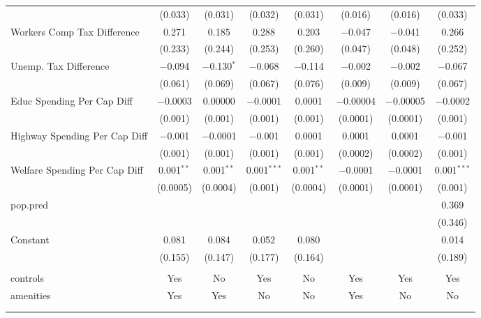 \begin{table}[!htbp]
\begin{tabular}{@{\extracolsep{5pt}}lccccccc}
  & (0.033) & (0.031) & (0.032) & (0.031) & (0.016) & (0.016) & (0.033) \\ 
  Workers Comp Tax Difference & 0.271 & 0.185 & 0.288 & 0.203 & $-$0.047 & $-$0.041 & 0.266 \\ 
  & (0.233) & (0.244) & (0.253) & (0.260) & (0.047) & (0.048) & (0.252) \\ 
  Unemp. Tax Difference & $-$0.094 & $-$0.130$^{*}$ & $-$0.068 & $-$0.114 & $-$0.002 & $-$0.002 & $-$0.067 \\ 
  & (0.061) & (0.069) & (0.067) & (0.076) & (0.009) & (0.009) & (0.067) \\ 
  Educ Spending Per Cap Diff & $-$0.0003 & 0.00000 & $-$0.0001 & 0.0001 & $-$0.00004 & $-$0.00005 & $-$0.0002 \\ 
  & (0.001) & (0.001) & (0.001) & (0.001) & (0.0001) & (0.0001) & (0.001) \\ 
  Highway Spending Per Cap Diff & $-$0.001 & $-$0.0001 & $-$0.001 & 0.0001 & 0.0001 & 0.0001 & $-$0.001 \\ 
  & (0.001) & (0.001) & (0.001) & (0.001) & (0.0002) & (0.0002) & (0.001) \\ 
  Welfare Spending Per Cap Diff & 0.001$^{**}$ & 0.001$^{**}$ & 0.001$^{***}$ & 0.001$^{**}$ & $-$0.0001 & $-$0.0001 & 0.001$^{***}$ \\ 
  & (0.0005) & (0.0004) & (0.001) & (0.0004) & (0.0001) & (0.0001) & (0.001) \\ 
  pop.pred &  &  &  &  &  &  & 0.369 \\ 
  &  &  &  &  &  &  & (0.346) \\ 
  Constant & 0.081 & 0.084 & 0.052 & 0.080 &  &  & 0.014 \\ 
  & (0.155) & (0.147) & (0.177) & (0.164) &  &  & (0.189) \\ 
 \hline \\[-1.8ex] 
controls & Yes & No & Yes & No & Yes & Yes & Yes \\ 
amenities & Yes & Yes & No & No & Yes & No & No \\ 
\hline \\[-1.8ex] 
\hline 
\hline \\[-1.8ex] 
\end{tabular} 
\end{table} 
